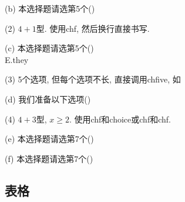 \documentclass[a4paper,12pt,twoside]{ctexart}
\begin{document}
    \noindent(b) 本选择题请选第5个\hfill (\qquad)
    \def\mychA{D}\def\mychB{E}\def\mychC{F}
    \def\mychA{A}\def\mychB{B}\def\mychC{C}

    \indent(2) $4+1$型. 使用chf, 然后换行直接书写.

    \noindent(c) 本选择题请选第5个\hfill (\quad)
    \\\mbox{} \quad E.they

    (3) 5个选项, 但每个选项不长, 直接调用chfive, 如

    \noindent (d) 我们准备以下选项\hfill (\quad)

    (4) $4+3$型, $x\ge2$. 使用chf和choice或chf和chf.

    \noindent(e) 本选择题请选第7个\hfill (\qquad)
    \def\mychA{E}\def\mychB{F}\def\mychC{G}
    \def\mychA{A}\def\mychB{B}\def\mychC{C}

    \noindent(f) 本选择题请选第7个\hfill (\qquad)
    \def\mychA{E}\def\mychB{F}\def\mychC{G}
    \def\mychA{A}\def\mychB{B}\def\mychC{C}

\subsection{表格}
\end{document}
